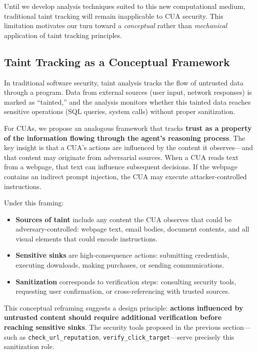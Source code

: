 Until we develop analysis techniques suited to this new computational medium, traditional taint tracking will remain inapplicable to CUA security. This limitation motivates our turn toward a \emph{conceptual} rather than \emph{mechanical} application of taint tracking principles.

\subsection{Taint Tracking as a Conceptual Framework}

In traditional software security, taint analysis tracks the flow of untrusted data through a program. Data from external sources (user input, network responses) is marked as ``tainted,'' and the analysis monitors whether this tainted data reaches sensitive operations (SQL queries, system calls) without proper sanitization.

For CUAs, we propose an analogous framework that tracks \textbf{trust as a property of the information flowing through the agent's reasoning process}. The key insight is that a CUA's actions are influenced by the content it observes---and that content may originate from adversarial sources. When a CUA reads text from a webpage, that text can influence subsequent decisions. If the webpage contains an indirect prompt injection, the CUA may execute attacker-controlled instructions.

Under this framing:
\begin{itemize}
    \item \textbf{Sources of taint} include any content the CUA observes that could be adversary-controlled: webpage text, email bodies, document contents, and all visual elements that could encode instructions.
    \item \textbf{Sensitive sinks} are high-consequence actions: submitting credentials, executing downloads, making purchases, or sending communications.
    \item \textbf{Sanitization} corresponds to verification steps: consulting security tools, requesting user confirmation, or cross-referencing with trusted sources.
\end{itemize}

This conceptual reframing suggests a design principle: \textbf{actions influenced by untrusted content should require additional verification before reaching sensitive sinks}. The security tools proposed in the previous section---such as \texttt{check\_url\_reputation}, \texttt{verify\_click\_target}---serve precisely this sanitization role.

